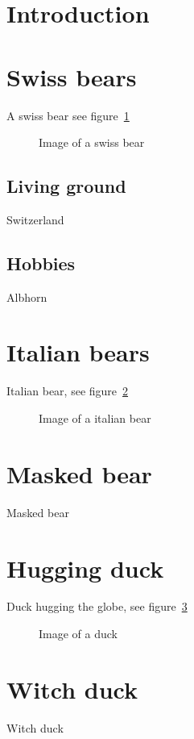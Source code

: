 \tableofcontents

\listoffigures

\newpage

\section{Introduction}


\section{Swiss bears}

A swiss bear see figure~\ref{fig:swissbear}

\begin{figure}
\caption{Image of a swiss bear\label{fig:swissbear}}
\end{figure}

\subsection{Living ground}

Switzerland

\subsection{Hobbies}

Albhorn

\section{Italian bears}

Italian bear, see figure~\ref{fig:italianbear}

\begin{figure}
\caption{Image of a italian bear\label{fig:italianbear}}
\end{figure}

\section{Masked bear}

Masked bear

\tagstructend %

\newpage


\section{Hugging duck}

Duck hugging the globe, see figure~\ref{fig:duck}

\begin{figure}
\caption{Image of a duck\label{fig:duck}}
\end{figure}


\section{Witch duck}

Witch duck

\tagstructend 